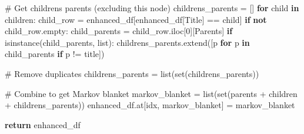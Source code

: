 \documentclass[
  11pt,
  letterpaper,
]{book}
\newenvironment{Shaded}{\begin{snugshade}}{\end{snugshade}}
\newcommand{\BuiltInTok}[1]{\textcolor[rgb]{0.00,0.23,0.31}{#1}}
\newcommand{\CommentTok}[1]{\textcolor[rgb]{0.37,0.37,0.37}{#1}}
\newcommand{\ControlFlowTok}[1]{\textcolor[rgb]{0.00,0.23,0.31}{\textbf{#1}}}
\newcommand{\DecValTok}[1]{\textcolor[rgb]{0.68,0.00,0.00}{#1}}
\newcommand{\KeywordTok}[1]{\textcolor[rgb]{0.00,0.23,0.31}{\textbf{#1}}}
\newcommand{\NormalTok}[1]{\textcolor[rgb]{0.00,0.23,0.31}{#1}}
\newcommand{\OperatorTok}[1]{\textcolor[rgb]{0.37,0.37,0.37}{#1}}
\newcommand{\StringTok}[1]{\textcolor[rgb]{0.13,0.47,0.30}{#1}}
\begin{document}
\begin{Shaded}
\begin{Highlighting}[]
        \CommentTok{\# Get children\textquotesingle{}s parents (excluding this node)}
\NormalTok{        childrens\_parents }\OperatorTok{=}\NormalTok{ []}
        \ControlFlowTok{for}\NormalTok{ child }\KeywordTok{in}\NormalTok{ children:}
\NormalTok{            child\_row }\OperatorTok{=}\NormalTok{ enhanced\_df[enhanced\_df[}\StringTok{\textquotesingle{}Title\textquotesingle{}}\NormalTok{] }\OperatorTok{==}\NormalTok{ child]}
            \ControlFlowTok{if} \KeywordTok{not}\NormalTok{ child\_row.empty:}
\NormalTok{                child\_parents }\OperatorTok{=}\NormalTok{ child\_row.iloc[}\DecValTok{0}\NormalTok{][}\StringTok{\textquotesingle{}Parents\textquotesingle{}}\NormalTok{]}
                \ControlFlowTok{if} \BuiltInTok{isinstance}\NormalTok{(child\_parents, }\BuiltInTok{list}\NormalTok{):}
\NormalTok{                    childrens\_parents.extend([p }\ControlFlowTok{for}\NormalTok{ p }\KeywordTok{in}\NormalTok{ child\_parents }\ControlFlowTok{if}\NormalTok{ p }\OperatorTok{!=}\NormalTok{ title])}

        \CommentTok{\# Remove duplicates}
\NormalTok{        childrens\_parents }\OperatorTok{=} \BuiltInTok{list}\NormalTok{(}\BuiltInTok{set}\NormalTok{(childrens\_parents))}

        \CommentTok{\# Combine to get Markov blanket}
\NormalTok{        markov\_blanket }\OperatorTok{=} \BuiltInTok{list}\NormalTok{(}\BuiltInTok{set}\NormalTok{(parents }\OperatorTok{+}\NormalTok{ children }\OperatorTok{+}\NormalTok{ childrens\_parents))}
\NormalTok{        enhanced\_df.at[idx, }\StringTok{\textquotesingle{}markov\_blanket\textquotesingle{}}\NormalTok{] }\OperatorTok{=}\NormalTok{ markov\_blanket}

    \ControlFlowTok{return}\NormalTok{ enhanced\_df}
\end{Highlighting}
\end{Shaded}
\end{document}

